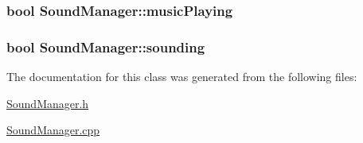 \hypertarget{classSoundManager_a448beccb044e3cbdbe72262f73bd464c}{
\subsubsection[{music\-Playing}]{\setlength{\rightskip}{0pt plus 5cm}bool Sound\-Manager\-::music\-Playing\hspace{0.3cm}{\ttfamily [private]}}}\label{classSoundManager_a448beccb044e3cbdbe72262f73bd464c}
\hypertarget{classSoundManager_a099128ef18dacf43acd4942aedf712a2}{
\subsubsection[{sounding}]{\setlength{\rightskip}{0pt plus 5cm}bool Sound\-Manager\-::sounding\hspace{0.3cm}{\ttfamily [private]}}}\label{classSoundManager_a099128ef18dacf43acd4942aedf712a2}


The documentation for this class was generated from the following files\-:\begin{DoxyCompactItemize}
\item 
\hyperlink{SoundManager_8h}{Sound\-Manager.\-h}\item 
\hyperlink{SoundManager_8cpp}{Sound\-Manager.\-cpp}\end{DoxyCompactItemize}
